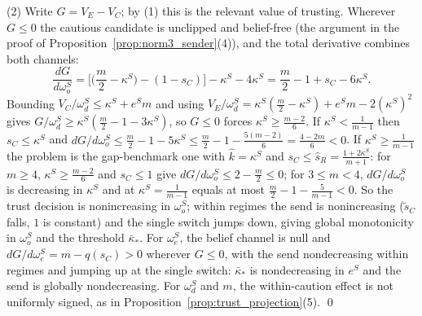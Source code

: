 \documentclass[11pt]{article}
\theoremstyle{plain}
\theoremstyle{remark}
\begin{document}
(2) Write $G=V_E-V_C$; by (1) this is the relevant value of trusting.  Wherever $G\le0$ the cautious candidate is unclipped and belief-free (the argument in the proof of Proposition~\ref{prop:norm3_sender}(4)), and the total derivative combines both channels:
\[
        \frac{dG}{d\omega_o^S}
        =\Big[\Big(\frac m2-\kappa^S\Big)-(1-s_C)\Big]-\kappa^S-4\kappa^S
        =\frac m2-1+s_C-6\kappa^S .
\]
Bounding $V_C/\omega_d^S\le\kappa^S+e^S m$ and using $V_E/\omega_d^S=\kappa^S(\tfrac m2-\kappa^S)+e^S m-2(\kappa^S)^2$ gives $G/\omega_d^S\ge\kappa^S(\tfrac m2-1-3\kappa^S)$, so $G\le0$ forces $\kappa^S\ge\tfrac{m-2}6$.  If $\kappa^S<\tfrac1{m-1}$ then $s_C\le\kappa^S$ and $dG/d\omega_o^S\le\tfrac m2-1-5\kappa^S\le\tfrac m2-1-\tfrac{5(m-2)}6=\tfrac{4-2m}6<0$.  If $\kappa^S\ge\tfrac1{m-1}$ the problem is the gap-benchmark one with $\hat k=\kappa^S$ and $s_C\le\hat s_R=\tfrac{1+2\kappa^S}{m+1}$: for $m\ge4$, $\kappa^S\ge\tfrac{m-2}6$ and $s_C\le1$ give $dG/d\omega_o^S\le2-\tfrac m2\le0$; for $3\le m<4$, $dG/d\omega_o^S$ is decreasing in $\kappa^S$ and at $\kappa^S=\tfrac1{m-1}$ equals at most $\tfrac m2-1-\tfrac5{m-1}<0$.  So the trust decision is nonincreasing in $\omega_o^S$; within regimes the send is nonincreasing ($\tilde s_C$ falls, $1$ is constant) and the single switch jumps down, giving global monotonicity in $\omega_o^S$ and the threshold $\bar\kappa_\ast$.  For $\omega_e^S$, the belief channel is null and $dG/d\omega_e^S=m-q(s_C)>0$ wherever $G\le0$, with the send nondecreasing within regimes and jumping up at the single switch: $\bar\kappa_\ast$ is nondecreasing in $e^S$ and the send is globally nondecreasing.  For $\omega_d^S$ and $m$, the within-caution effect is not uniformly signed, as in Proposition~\ref{prop:trust_projection}(5).
\qed
\fi
\end{document}
